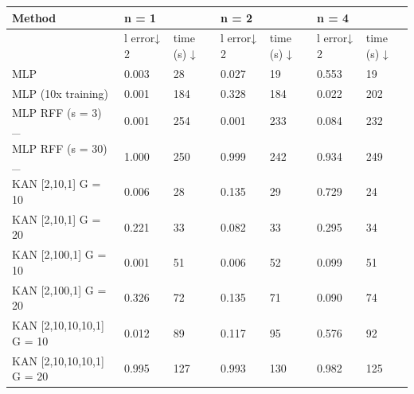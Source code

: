 \begin{tabular}{lllllll}
\toprule
Method & n = 1 &  & n = 2 &  & n = 4 &  \\
\midrule
 & l error↓ 2 & time (s) ↓ & l error↓ 2 & time (s) ↓ & l error↓ 2 & time (s) ↓ \\
MLP & 0.003 & 28 & 0.027 & 19 & 0.553 & 19 \\
MLP (10x training) & 0.001 & 184 & 0.328 & 184 & 0.022 & 202 \\
MLP RFF (s = 3) \_ & 0.001 & 254 & 0.001 & 233 & 0.084 & 232 \\
MLP RFF (s = 30) \_ & 1.000 & 250 & 0.999 & 242 & 0.934 & 249 \\
KAN [2,10,1] G = 10 & 0.006 & 28 & 0.135 & 29 & 0.729 & 24 \\
KAN [2,10,1] G = 20 & 0.221 & 33 & 0.082 & 33 & 0.295 & 34 \\
KAN [2,100,1] G = 10 & 0.001 & 51 & 0.006 & 52 & 0.099 & 51 \\
KAN [2,100,1] G = 20 & 0.326 & 72 & 0.135 & 71 & 0.090 & 74 \\
KAN [2,10,10,10,1] G = 10 & 0.012 & 89 & 0.117 & 95 & 0.576 & 92 \\
KAN [2,10,10,10,1] G = 20 & 0.995 & 127 & 0.993 & 130 & 0.982 & 125 \\
\bottomrule
\end{tabular}
